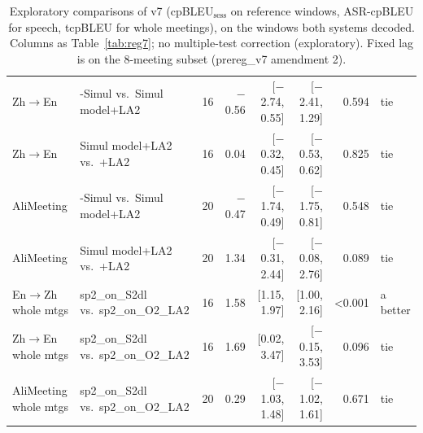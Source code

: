 \begin{table}[t]
{\begin{tabular}{llrrrrrl}
Zh$\rightarrow$En & \sys{}-Simul vs.\ Simul model+LA2 & 16 & $-$0.56 & [$-$2.74, 0.55] & [$-$2.41, 1.29] & 0.594 & tie \\
Zh$\rightarrow$En & Simul model+LA2 vs.\ \sys{}+LA2 & 16 & 0.04 & [$-$0.32, 0.45] & [$-$0.53, 0.62] & 0.825 & tie \\
AliMeeting & \sys{}-Simul vs.\ Simul model+LA2 & 20 & $-$0.47 & [$-$1.74, 0.49] & [$-$1.75, 0.81] & 0.548 & tie \\
AliMeeting & Simul model+LA2 vs.\ \sys{}+LA2 & 20 & 1.34 & [$-$0.31, 2.44] & [$-$0.08, 2.76] & 0.089 & tie \\
En$\rightarrow$Zh whole mtgs & sp2\_on\_S2dl vs.\ sp2\_on\_O2\_LA2 & 16 & 1.58 & [1.15, 1.97] & [1.00, 2.16] & {<}0.001 & a better \\
Zh$\rightarrow$En whole mtgs & sp2\_on\_S2dl vs.\ sp2\_on\_O2\_LA2 & 16 & 1.69 & [0.02, 3.47] & [$-$0.15, 3.53] & 0.096 & tie \\
AliMeeting whole mtgs & sp2\_on\_S2dl vs.\ sp2\_on\_O2\_LA2 & 20 & 0.29 & [$-$1.03, 1.48] & [$-$1.02, 1.61] & 0.671 & tie \\
\bottomrule
\end{tabular}}
\caption{Exploratory comparisons of v7 (cpBLEU$_\text{sess}$ on reference windows, ASR-cpBLEU for speech, tcpBLEU for whole meetings), on the windows both systems decoded. Columns as Table~\ref{tab:reg7}; no multiple-test correction (exploratory). Fixed lag is on the 8-meeting subset (prereg\_v7 amendment 2).}
\label{tab:sig7}
\end{table}
